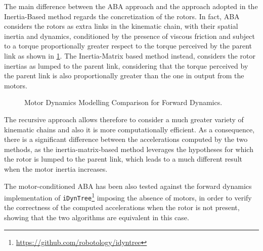 The main difference between the \ac{ABA} approach and the approach adopted in the Inertia-Based method regards the concretization of the rotors. In fact, \ac{ABA} considers the rotors as extra links in the kinematic chain, with their spatial inertia and dynamics, conditioned by the presence of viscous friction and subject to a torque proportionally greater respect to the torque perceived by the parent link as shown in \cref{fig:ABA_comparison}. The Inertia-Matrix based method instead, considers the rotor inertias as lumped to the parent link, considering that the torque perceived by the parent link is also proportionally greater than the one in output from the motors.

\begin{figure}
    \centering
    \caption{Motor Dynamics Modelling Comparison for Forward Dynamics.}
    \label{fig:ABA_comparison}
\end{figure}

The recursive approach allows therefore to consider a much greater variety of kinematic chains and also it is more computationally efficient. As a consequence, there is a significant difference between the accelerations computed by the two methods, as the inertia-matrix-based method leverages the hypotheses for which the rotor is lumped to the parent link, which leads to a much different result when the motor inertia increases.

The motor-conditioned \ac{ABA} has been also tested against the forward dynamics implementation of \texttt{iDynTree}\footnote{\url{https://github.com/robotology/idyntree}} \citep{10.3389/frobt.2015.00006} imposing the absence of motors, in order to verify the correctness of the computed accelerations when the rotor is not present, showing that the two algorithms are equivalent in this case.
